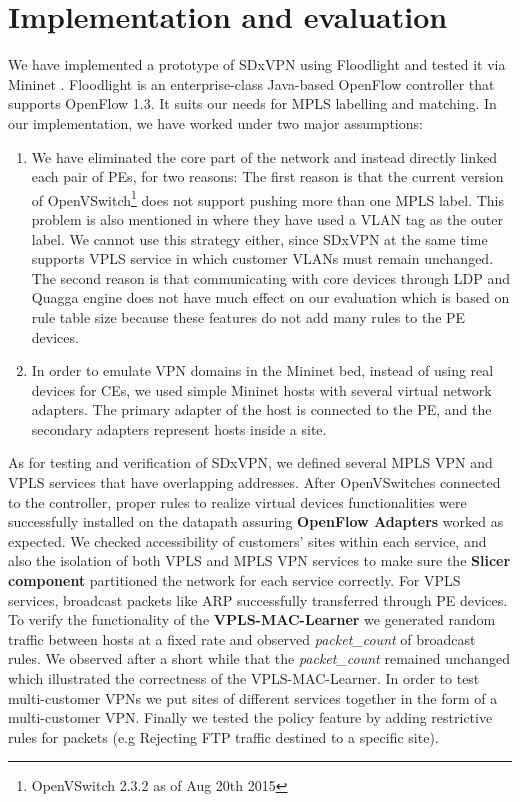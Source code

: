 \documentclass[10pt,conference]{IEEEtran}
\begin{document}
\section{Implementation and  evaluation}\label{sec:6}

We have implemented a prototype of SDxVPN using Floodlight \cite{21} and tested it via Mininet \cite{22}. Floodlight is an enterprise-class Java-based OpenFlow controller that supports OpenFlow 1.3. It suits our needs for MPLS labelling and matching. In our implementation, we have worked under two major assumptions:
\begin{enumerate}
\item[(1)] We have eliminated the core part of the network and instead directly linked each pair of PEs, for two reasons: The first reason is that the current version of OpenVSwitch\footnote{OpenVSwitch 2.3.2 as of Aug 20th 2015} does not support pushing more than one MPLS label. This problem is also mentioned in \cite{14} where they have used a VLAN tag as the outer label. We cannot use this strategy either, since SDxVPN at the same time supports VPLS service in which customer VLANs must remain unchanged.
The second reason is that communicating with core devices through LDP and Quagga engine does not have much effect on our evaluation which is based on rule table size because these features do not add many rules to the PE devices.
\item[(2)]

In order to emulate VPN domains in the Mininet bed, instead of using real devices for CEs, we used simple Mininet hosts with several virtual network adapters. The primary adapter of the host is connected to the PE, and the secondary adapters represent hosts inside a site.
\end{enumerate}

As for testing and verification of SDxVPN, we defined several MPLS VPN and VPLS services that have overlapping addresses.
After OpenVSwitches connected to the controller, proper rules to realize virtual devices functionalities were successfully installed on the datapath assuring \textbf{OpenFlow Adapters} worked as expected.
We checked accessibility of customers' sites within each service, and also the isolation of both VPLS and MPLS VPN services to make sure the \textbf{Slicer component} partitioned the network for each service correctly.
For VPLS services, broadcast packets like ARP successfully transferred through PE devices.
To verify the functionality of the \textbf{VPLS-MAC-Learner} we generated random traffic between hosts at a fixed rate and observed \textit{packet\_count} of broadcast rules. We observed after a short while that the \textit{packet\_count} remained unchanged which illustrated the correctness of the VPLS-MAC-Learner.
In order to test multi-customer VPNs we put sites of different services together in the form of a multi-customer VPN. Finally we tested the policy feature by adding restrictive rules for packets (e.g Rejecting FTP traffic destined to a specific site).
 
\end{document}
